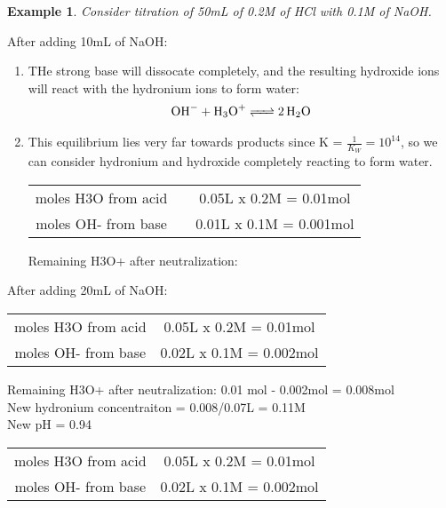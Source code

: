 \documentclass[../CHEM152Notes.tex]{subfiles}
\newtheorem{exmp}{Example}
\begin{document}
\begin{exmp}
    Consider titration of 50mL of 0.2M of HCl with 0.1M of NaOH.
\end{exmp}
After adding 10mL of NaOH:
\begin{enumerate}
    \item THe strong base will dissocate completely, and the resulting hydroxide ions will react with the hydronium ions to form water:
    \begin{equation*}
        \begin{aligned}
            \ce{OH- + H3O+ <=> 2H2O}
        \end{aligned}
    \end{equation*}
    \item This equilibrium lies very far towards products since K = $\frac{1}{K_W} = 10^{14}$, so we can consider hydronium and hydroxide completely reacting to form water.
    \newline
    \begin{tabular}{c@{}c@{}c@{}}
        moles H3O from acid && 0.05L x 0.2M = 0.01mol \\
        moles OH- from base && 0.01L x 0.1M = 0.001mol \\
    \end{tabular}
    \newline
    Remaining H3O+ after neutralization:
\end{enumerate}
After adding 20mL of NaOH:
\begin{tabular}{c c}
    moles H3O from acid & 0.05L x 0.2M = 0.01mol \\
    moles OH- from base & 0.02L x 0.1M = 0.002mol \\
\end{tabular}
Remaining H3O+ after neutralization: 0.01 mol - 0.002mol = 0.008mol \\
New hydronium concentraiton =  0.008/0.07L = 0.11M \\
New pH = 0.94 \\
\newline
\begin{tabular}{ c c }
    moles H3O from acid & 0.05L x 0.2M = 0.01mol \\
    moles OH- from base & 0.02L x 0.1M = 0.002mol \\
\end{tabular}
\newline
\end{document}
